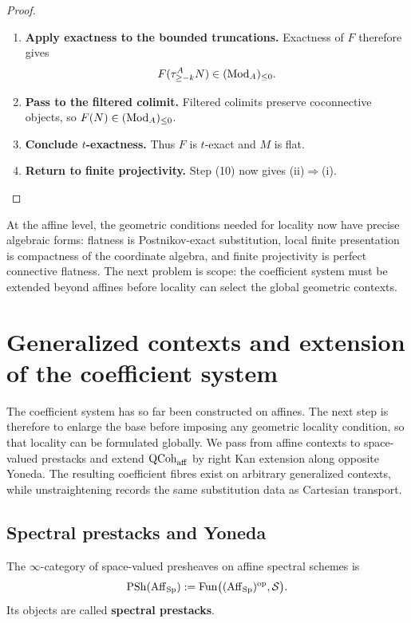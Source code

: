 \begin{proof}
\begin{enumerate}[label=\textup{(\arabic*)}]
    \item \textbf{Apply exactness to the bounded truncations.}
    Exactness
    of \(F\) therefore gives
    \[
        F(\tau_{\geq-k}^{A}N)\in(\operatorname{Mod}_{A})_{\leq0}.
    \]

    \item \textbf{Pass to the filtered colimit.}
    Filtered colimits preserve coconnective objects, so
    \(F(N)\in(\operatorname{Mod}_{A})_{\leq0}\).

    \item \textbf{Conclude $t$-exactness.}
    Thus \(F\) is \(t\)-exact and \(M\) is flat.

    \item \textbf{Return to finite projectivity.}
    Step \textup{(10)} now gives \textup{(ii)}\(\Rightarrow\)\textup{(i)}.
\end{enumerate}
\end{proof}

At the affine level, the geometric conditions needed for locality now have
precise algebraic forms: flatness is Postnikov-exact substitution, local
finite presentation is compactness of the coordinate algebra, and finite
projectivity is perfect connective flatness. The next problem is scope: the coefficient system must be extended beyond
affines before locality can select the global geometric contexts.

\section{Generalized contexts and extension of the coefficient system}
\label{sec:spectral-prestacks-qcoh}

The coefficient system has so far been constructed on affines. The next step
is therefore to enlarge the base before imposing any geometric locality
condition, so that locality can be formulated globally. We pass from affine
contexts to space-valued prestacks and extend \(\operatorname{QCoh}_{\mathrm{aff}}\) by
right Kan extension along opposite Yoneda. The resulting coefficient fibres
exist on arbitrary generalized contexts, while unstraightening records the
same substitution data as Cartesian transport.

\subsection{Spectral prestacks and Yoneda}


\begin{definition}
\label{def:spectral-prestacks-affine-stage}
The $\infty$-category of space-valued presheaves on affine spectral
schemes is
\[
    \operatorname{PSh}(\operatorname{Aff}_{\operatorname{Sp}})
    :=
    \operatorname{Fun}
    \bigl(
        (\operatorname{Aff}_{\operatorname{Sp}})^{\mathrm{op}},
        \mathcal S
    \bigr).
\]
Its objects are called \textbf{spectral prestacks}.
\end{definition}

